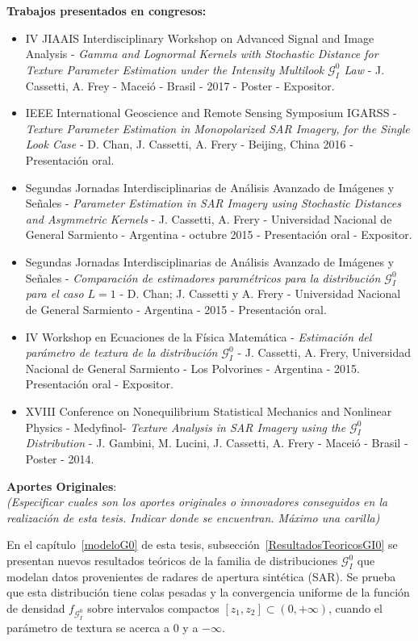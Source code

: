 \textbf{Trabajos presentados en congresos:}
		\begin{itemize}
			\item  	IV JIAAIS Interdisciplinary Workshop on Advanced Signal and Image Analysis -  \emph{Gamma and Lognormal Kernels with Stochastic Distance for Texture Parameter Estimation under the Intensity Multilook $\mathcal{G}_I^0$ Law} - J. Cassetti, A. Frey - Maceió  - Brasil - 2017 - Poster -  Expositor.
			\item  IEEE International Geoscience and Remote Sensing Symposium IGARSS - \emph{Texture Parameter Estimation in Monopolarized SAR Imagery, for the Single Look Case} - D. Chan, J. Cassetti, A. Frery  - Beijing, China 2016 - Presentación oral.
			\item Segundas Jornadas Interdisciplinarias de Análisis Avanzado de Imágenes y Señales  - \emph{Parameter Estimation in SAR Imagery using Stochastic Distances and Asymmetric Kernels} - J. Cassetti, A. Frery - Universidad Nacional de General Sarmiento - Argentina - octubre 2015 - Presentación oral - Expositor.
			\item Segundas Jornadas Interdisciplinarias de Análisis Avanzado de Imágenes y Señales - \emph{Comparación de estimadores paramétricos para la distribución $\mathcal{G}_I^0$ para el caso $L = 1$} -  D. Chan; J. Cassetti y A. Frery - Universidad Nacional de General Sarmiento - Argentina - 2015  - Presentación oral.
			\item IV Workshop en Ecuaciones de la Física Matemática  - \emph{Estimación del parámetro de textura de la distribución $\mathcal{G}_I^0$} - J. Cassetti, A. Frery, Universidad Nacional de General Sarmiento - Los Polvorines - Argentina - 2015. Presentación oral - Expositor.
			\item XVIII Conference on Nonequilibrium Statistical Mechanics and Nonlinear Physics - Medyfinol- \emph{Texture Analysis in SAR Imagery using the $\mathcal{G}_I^0$ Distribution}  - J. Gambini,  M. Lucini, J. Cassetti, A. Frery - Maceió  - Brasil - Poster - 2014.
		\end{itemize}
\newpage

\textbf{Aportes Originales}:\\
\emph{(Especificar cuales son los aportes originales o innovadores conseguidos en la realización de esta tesis. Indicar donde se encuentran. Máximo una carilla)}

\vspace{0.5cm}
En el capítulo~\ref{modeloG0} de esta tesis, subsección~\ref{ResultadosTeoricosGI0} se presentan nuevos resultados teóricos de la familia de distribuciones $\mathcal{G}_I^0$ que modelan datos provenientes de radares de apertura sintética (SAR). Se prueba que esta distribución tiene colas pesadas y la convergencia uniforme de la función de densidad $f_{\mathcal{G}_I^0}$ sobre intervalos compactos $[z_1,z_2]\subset(0,+\infty)$, cuando el parámetro de textura se acerca a $0$ y a $-\infty$.

